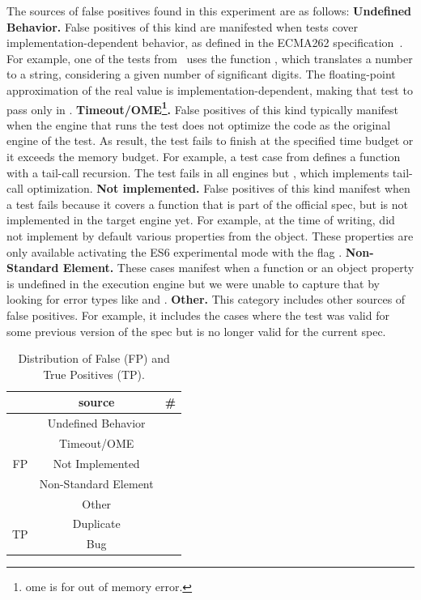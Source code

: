 \documentclass[smallextended]{svjour3}
\begin{document}
\sloppy The sources of false positives found in this experiment are as
follows: \textbf{Undefined Behavior.} False positives of this kind are
manifested when tests cover implementation-dependent behavior, as
defined in the ECMA262 specification~\cite{ecmas262-spec}. For
example, one of the tests from \jerry\ uses the function
, which translates a number to
a string, considering a given number of significant digits. The
floating-point approximation of the real value is
implementation-dependent, making that test to pass only in
\chakra. \textbf{Timeout/OME\footnote{ome is for out of memory
    error.}.} False positives of this kind typically manifest when the
engine that runs the test does not optimize the code as the original
engine of the test. As result, the test fails to finish at the
specified time budget or it exceeds the memory budget. For example, a
test case from \jsc{} defines a function with a tail-call
recursion. The test fails in all engines but \jsc{}, which implements
tail-call optimization. \textbf{Not implemented.} False positives of
this kind manifest when a test fails because it covers a function that
is part of the official spec, but is not implemented in the target
engine yet. For example, at the time of writing, \chakra{} did not
implement by default various properties from the 
object. These properties are only available activating the ES6
experimental mode with the flag .
\textbf{Non-Standard Element.} These cases manifest when a function or
an object property is undefined in the execution engine but we were
unable to capture that by looking for error types like
 and .  \textbf{Other.} This category
includes other sources of false positives. For example, it includes
the cases where the test was valid for some previous version of the
spec but is no longer valid for the current spec.

\begin{table}
  \centering
  \caption{\label{fig:falsepositives}\label{fig:truepositives}\label{fig:piecharts-transplantation}Distribution
    of False (FP) and True Positives (TP).}
  \renewcommand*{\arraystretch}{0.9}
  \begin{tabular}{ccr}
    \toprule
    & source &  \#\\
    \midrule
    \multirow{5}{*}{FP} & Undefined Behavior & \noTransUndefined{} \\
    & Timeout/OME & \noTransTimeout{} \\
    & Not Implemented & \noTransNotImplemented{} \\
    & Non-Standard Element & \noTransNonStandard{} \\
    & Other & \noTransOther{} \\
    \midrule
    \multirow{2}{*}{TP} & Duplicate & \noTransTPDuplicated{} \\
    & Bug & \noTransTPBugs{} \\
    \bottomrule
  \end{tabular}
\end{table}
\end{document}

